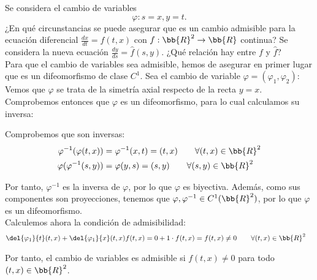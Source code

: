 \documentclass[12pt]{article}
\begin{document}
    \begin{ejercicio}
        Se considera el cambio de variables
        \begin{equation*}
            \varphi : s = x, y = t.
        \end{equation*}
        ¿En qué circunstancias se puede asegurar que es un cambio admisible para la ecuación diferencial $\frac{dx}{dt} = f(t, x)$ con $f : \bb{R}^2 \to \bb{R}$ continua?
        Se considera la nueva ecuación $\frac{dy}{ds} = \hat{f}(s, y)$. ¿Qué relación hay entre $f$ y $\hat{f}$?\\

        Para que el cambio de variables sea admisible, hemos de asegurar en primer lugar que es un difeomorfismo de clase $C^1$.
        Sea el cambio de variable $\varphi=(\varphi_1, \varphi_2)$:
        Vemos que $\varphi$ se trata de la simetría axial respecto de la recta $y=x$. Comprobemos entonces que $\varphi$ es un difeomorfismo, para lo cual calculamos su inversa:

        Comprobemos que son inversas:
        \begin{align*}
            \varphi^{-1}(\varphi(t,x)) &= \varphi^{-1}(x,t) = (t,x)\qquad \forall (t,x)\in\bb{R}^2\\
            \varphi(\varphi^{-1}(s,y)) &= \varphi(y,s) = (s,y) \qquad \forall (s,y)\in\bb{R}^2
        \end{align*}

        Por tanto, $\varphi^{-1}$ es la inversa de $\varphi$, por lo que $\varphi$ es biyectiva. Además, como sus componentes son proyecciones, tenemos que $\varphi, \varphi^{-1}\in C^1(\bb{R}^2)$, por lo que $\varphi$ es un difeomorfismo.\\

        Calculemos ahora la condición de admisibilidad:
        \begin{align*}
            \del{\varphi_1}{t}(t,x) + \del{\varphi_1}{x}(t,x)f(t,x) &= 0 + 1\cdot f(t,x) = f(t,x) \neq 0 \qquad \forall (t,x)\in\bb{R}^2
        \end{align*}

        Por tanto, el cambio de variables es admisible si $f(t,x)\neq 0$ para todo $(t,x)\in\bb{R}^2$.\\
        \begin{comment}
        \hat{f} = \dfrac{1}{f(y,x)}
        \end{comment}

    \end{ejercicio}
\end{document}
